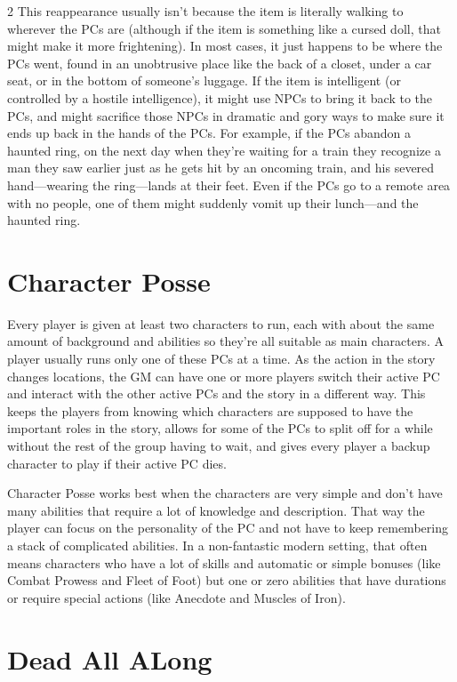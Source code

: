 \begin{multicols}{2}
This reappearance usually isn’t because the item is literally walking to wherever the PCs are (although if the item is something like a cursed doll, that might make it more frightening). In most cases, it just happens to be where the PCs went, found in an unobtrusive place like the back of a closet, under a car seat, or in the bottom of someone’s luggage. If the item is intelligent (or controlled by a hostile intelligence), it might use NPCs to bring it back to the PCs, and might sacrifice those NPCs in dramatic and gory ways to make sure it ends up back in the hands of the PCs. For example, if the PCs abandon a haunted ring, on the next day when they’re waiting for a train they recognize a man they saw earlier just as he gets hit by an oncoming train, and his severed hand—wearing the ring—lands at their feet. Even if the PCs go to a remote area with no people, one of them might suddenly vomit up their lunch—and the haunted ring.

\section{Character Posse}

Every player is given at least two characters to run, each with about the same amount of background and abilities so they’re all suitable as main characters. A player usually runs only one of these PCs at a time. As the action in the story changes locations, the GM can have one or more players switch their active PC and interact with the other active PCs and the story in a different way. This keeps the players from knowing which characters are supposed to have the important roles in the story, allows for some of the PCs to split off for a while without the rest of the group having to wait, and gives every player a backup character to play if their active PC dies.

Character Posse works best when the characters are very simple and don’t have many abilities that require a lot of knowledge and description. That way the player can focus on the personality of the PC and not have to keep remembering a stack of complicated abilities. In a non-fantastic modern setting, that often means characters who have a lot of skills and automatic or simple bonuses (like Combat Prowess and Fleet of Foot) but one or zero abilities that have durations or require special actions (like Anecdote and Muscles of Iron).

\section{Dead All ALong}


\end{multicols}
